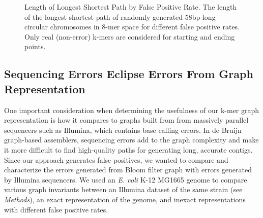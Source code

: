 \documentclass[12pt]{article} \usepackage{simplemargins}
\begin{document}
\begin{figure}
\caption{Length of Longest Shortest Path by False Positive Rate. The 
length of the longest shortest path of randomly generated 58bp 
long circular chromosomes in 8-mer 
space for different false positive rates. Only real (non-error) k-mers are
considered for starting and ending points.}
\end{figure}

\subsection{Sequencing Errors Eclipse Errors From Graph Representation}
One important consideration when determining the usefulness of our k-mer
graph representation is how it compares to graphs built from from massively
parallel sequencers such as Illumina, which contains base calling errors. 
In de Bruijn graph-based
assemblers, sequencing errors add to the graph complexity and make it
more difficult to find high-quality paths for generating long,
accurate contigs. Since our approach generates
false positives, we wanted to compare and characterize the errors 
generated from Bloom filter graph with errors generated by 
Illumina sequencers. We used an \emph{E. coli} K-12 MG1665 genome to 
compare various graph invariants between an Illumina dataset of 
the same strain 
(see \emph{Methods}), an exact representation of the genome, and 
inexact representations with different false positive rates.
\end{document}
